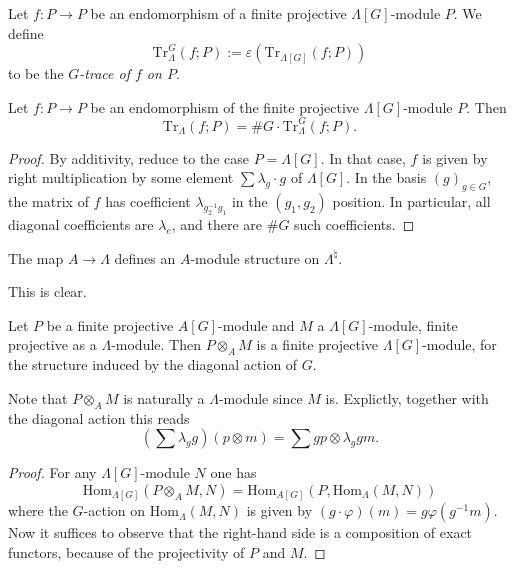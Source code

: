 \begin{definition}
\label{definition-trace-G}
Let $f: P\to P$ be an
endomorphism of a finite projective $\Lambda[G]$-module
$P$. We define
$$
\text{Tr}_{\Lambda}^G(f; P) := \varepsilon\left(\text{Tr}_{\Lambda[G]}(f;
P)\right)
$$
to be the {\it $G$-trace of $f$ on $P$}.
\end{definition}

\begin{lemma}
\label{lemma-lambda-trace}
Let $f: P\to P$ be an endomorphism of the finite projective
$\Lambda[G]$-module $P$. Then
$$
\text{Tr}_{\Lambda}(f; P) = \# G \cdot \text{Tr}_\Lambda^G(f; P).
$$
\end{lemma}

\begin{proof}
By additivity, reduce to the case $P = \Lambda[G]$.
In that case, $f$ is given by
right multiplication by some element $\sum\lambda_g\cdot g$ of $\Lambda[G]$. In
the basis $(g)_{g \in G}$, the matrix of $f$ has coefficient
$\lambda_{g_2^{-1}g_1}$ in the $(g_1, g_2)$ position. In particular, all
diagonal coefficients are $\lambda_e$, and there are $\#G$ such coefficients.
\end{proof}

\begin{lemma}
\label{lemma-A-module-structure}
The map $A\to \Lambda$ defines an $A$-module structure on $\Lambda^\natural$.
\end{lemma}

\noindent
This is clear.

\begin{lemma}
\label{lemma-diagonal-action-projective-module}
Let $P$ be a finite projective $A[G]$-module and $M$ a $\Lambda[G]$-module,
finite projective as a $\Lambda$-module. Then $P\otimes_A M$ is a finite
projective $\Lambda[G]$-module, for the structure induced by the diagonal
action of $G$.
\end{lemma}

\noindent
Note that $P\otimes_A M$ is naturally a $\Lambda$-module since $M$ is.
Explictly, together with the diagonal action this reads
$$
\left(\sum\lambda_g g\right)\left(p\otimes m\right)
=
\sum g p \otimes \lambda_g g m.
$$

\begin{proof}
For any $\Lambda[G]$-module $N$ one has
$$
\text{Hom}_{\Lambda[G]}\left(P\otimes_A M, N\right)= \text{Hom}_{A[G]}\left(P,
\text{Hom}_{\Lambda}(M, N)\right)
$$
where the $G$-action on $\text{Hom}_{\Lambda}(M, N)$ is given by $(g\cdot
\varphi)(m) = g \varphi (g^{-1} m) $. Now it suffices to observe that the
right-hand side is a composition of exact functors, because of the projectivity
of $P$ and $M$.
\end{proof}

